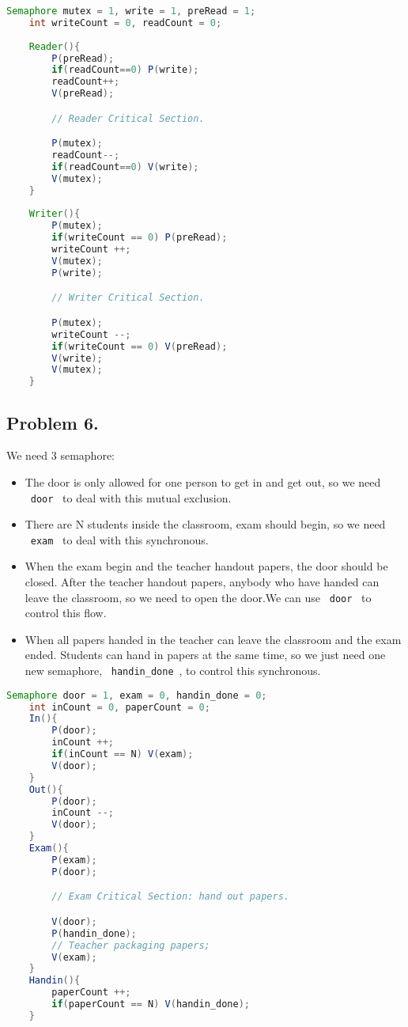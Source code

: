 \documentclass[11pt]{article}
\begin{document}
\begin{lstlisting}[language = Java]
    Semaphore mutex = 1, write = 1, preRead = 1;
    int writeCount = 0, readCount = 0;
    
    Reader(){
        P(preRead);
        if(readCount==0) P(write);
        readCount++;
        V(preRead);

        // Reader Critical Section.

        P(mutex);
        readCount--;
        if(readCount==0) V(write);
        V(mutex);
    }
    
    Writer(){
        P(mutex);
        if(writeCount == 0) P(preRead);
        writeCount ++;
        V(mutex);
        P(write);

        // Writer Critical Section.

        P(mutex);
        writeCount --;
        if(writeCount == 0) V(preRead);
        V(write);
        V(mutex);
    }
\end{lstlisting}

\subsection*{Problem 6. }

We need 3 semaphore:
\begin{itemize}
    \item The door is only allowed for one person to get in and get out, so we need ~\lstinline{door}~ to deal with this mutual exclusion.
    \item There are N students inside the classroom, exam should begin, so we need ~\lstinline{exam}~ to deal with this synchronous.
    \item When the exam begin and the teacher handout papers, the door should be closed. After the teacher handout papers, 
        anybody who have handed can leave the classroom, so we need to open the door.We can use ~\lstinline{door}~ to control this flow. 
    \item When all papers handed in the teacher can leave the classroom and the exam ended.
        Students can hand in papers at the same time, so we just need one new semaphore, ~\lstinline{handin_done}~, to control this synchronous. 
\end{itemize}

\begin{lstlisting}[language = Java]
    Semaphore door = 1, exam = 0, handin_done = 0;
    int inCount = 0, paperCount = 0;
    In(){
        P(door);
        inCount ++;
        if(inCount == N) V(exam);
        V(door);
    }
    Out(){
        P(door);
        inCount --;
        V(door);
    }
    Exam(){
        P(exam);
        P(door);

        // Exam Critical Section: hand out papers.

        V(door);
        P(handin_done);
        // Teacher packaging papers;
        V(exam);
    }
    Handin(){
        paperCount ++;
        if(paperCount == N) V(handin_done);
    }
\end{lstlisting}
\end{document}
